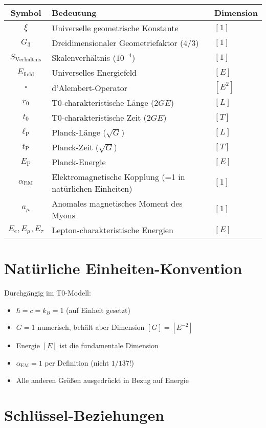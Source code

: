 \documentclass[12pt,a4paper]{report}
\newcommand{\EP}{E_{\text{P}}}            %
\newcommand{\lP}{\ell_{\text{P}}}         %
\newcommand{\tP}{t_{\text{P}}}            %
\newcommand{\rzero}{r_0}                  %
\newcommand{\tzero}{t_0}                  %
\begin{document}
	\begin{longtable}{|c|l|l|}
		\hline
		\textbf{Symbol} & \textbf{Bedeutung} & \textbf{Dimension} \\
		\hline
		$\xi$ & Universelle geometrische Konstante & $[1]$ \\
		$G_3$ & Dreidimensionaler Geometriefaktor ($4/3$) & $[1]$ \\
		$S_{\text{Verhältnis}}$ & Skalenverhältnis ($10^{-4}$) & $[1]$ \\
		$E_{\text{field}}$ & Universelles Energiefeld & $[E]$ \\
		$\square$ & d'Alembert-Operator & $[E^2]$ \\
		$\rzero$ & T0-charakteristische Länge ($2GE$) & $[L]$ \\
		$\tzero$ & T0-charakteristische Zeit ($2GE$) & $[T]$ \\
		$\lP$ & Planck-Länge ($\sqrt{G}$) & $[L]$ \\
		$\tP$ & Planck-Zeit ($\sqrt{G}$) & $[T]$ \\
		$\EP$ & Planck-Energie & $[E]$ \\
		$\alpha_{\text{EM}}$ & Elektromagnetische Kopplung (=1 in natürlichen Einheiten) & $[1]$ \\
		$a_\mu$ & Anomales magnetisches Moment des Myons & $[1]$ \\
		$E_e, E_\mu, E_\tau$ & Lepton-charakteristische Energien & $[E]$ \\
		\hline
	\end{longtable}
	
	\section{Natürliche Einheiten-Konvention}
	\label{sec:natural_units_convention}
	
	Durchgängig im T0-Modell:
	\begin{itemize}
		\item $\hbar = c = k_B = 1$ (auf Einheit gesetzt)
		\item $G = 1$ numerisch, behält aber Dimension $[G] = [E^{-2}]$
		\item Energie $[E]$ ist die fundamentale Dimension
		\item $\alpha_{\text{EM}} = 1$ per Definition (nicht $1/137$!)
		\item Alle anderen Größen ausgedrückt in Bezug auf Energie
	\end{itemize}
	
	\section{Schlüssel-Beziehungen}
	\label{sec:key_relationships}
	
\end{document}
